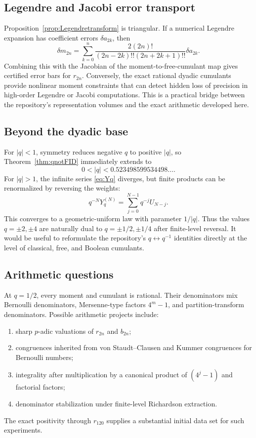 \documentclass[11pt,oneside]{article}
\theoremstyle{definition}
\theoremstyle{remark}
\begin{document}
\subsection{Legendre and Jacobi error transport}
Proposition~\ref{prop:Legendretransform} is triangular. If a numerical Legendre expansion has coefficient errors \(\delta a_{2k}\), then
\[
\delta m_{2n}=\sum_{k=0}^n
\frac{2(2n)!}{(2n-2k)!!(2n+2k+1)!!}\delta a_{2k}.
\]
Combining this with the Jacobian of the moment-to-free-cumulant map gives certified error bars for \(r_{2n}\). Conversely, the exact rational dyadic cumulants provide nonlinear moment constraints that can detect hidden loss of precision in high-order Legendre or Jacobi computations. This is a practical bridge between the repository's representation volumes and the exact arithmetic developed here.

\subsection{Beyond the dyadic base}
For \(|q|<1\), symmetry reduces negative \(q\) to positive \(|q|\), so Theorem~\ref{thm:qnotFID} immediately extends to
\[
0<|q|<0.523498599534498\ldots.
\]
For \(|q|>1\), the infinite series \eqref{eq:Yq} diverges, but finite products can be renormalized by reversing the weights:
\[
q^{-N}Y_q^{(N)}=\sum_{j=0}^{N-1}q^{-j}U_{N-j}.
\]
This converges to a geometric-uniform law with parameter \(1/|q|\). Thus the values \(q=\pm2,\pm4\) are naturally dual to \(q=\pm1/2,\pm1/4\) after finite-level reversal. It would be useful to reformulate the repository's \(q\leftrightarrow q^{-1}\) identities directly at the level of classical, free, and Boolean cumulants.

\subsection{Arithmetic questions}
At \(q=1/2\), every moment and cumulant is rational. Their denominators mix Bernoulli denominators, Mersenne-type factors \(4^m-1\), and partition-transform denominators. Possible arithmetic projects include:
\begin{enumerate}[label=(\roman*)]
\item sharp \(p\)-adic valuations of \(r_{2n}\) and \(b_{2n}\);
\item congruences inherited from von Staudt--Clausen and Kummer congruences for Bernoulli numbers;
\item integrality after multiplication by a canonical product of \((4^j-1)\) and factorial factors;
\item denominator stabilization under finite-level Richardson extraction.
\end{enumerate}
The exact positivity through \(r_{120}\) supplies a substantial initial data set for such experiments.
\end{document}
